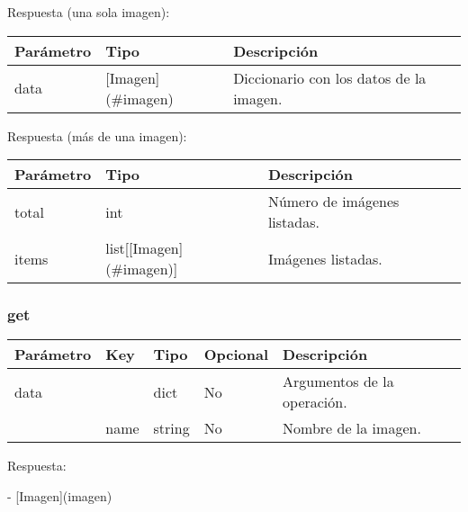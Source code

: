 				Respuesta (una sola imagen):
				\begin{table}[!h]
					\centering
	\begin{adjustbox}{max width=\textwidth}
					\begin{tabular}{|l|l|l|}
						\hline
						Parámetro & Tipo & Descripción \\ \hline
						data & [Imagen](\#imagen) & Diccionario con los datos de la imagen. \\ \hline
					\end{tabular}
\end{adjustbox}
				\end{table}
			
				Respuesta (más de una imagen):
				\begin{table}[!h]
					\centering
	\begin{adjustbox}{max width=\textwidth}
					\begin{tabular}{|l|l|l|}
						\hline
						Parámetro & Tipo & Descripción \\ \hline
						total & int & Número de imágenes listadas. \\ \hline
						items & list[[Imagen](\#imagen)] & Imágenes listadas. \\ \hline
					\end{tabular}
\end{adjustbox}
				\end{table}
			
			\subsubsection{get}
				\begin{table}[!h]
					\centering
	\begin{adjustbox}{max width=\textwidth}
					\begin{tabular}{|l|l|l|l|l|}
						\hline
						Parámetro & Key & Tipo & Opcional & Descripción \\ \hline
						data &  & dict & No & Argumentos de la operación. \\ \hline
						& name & string & No & Nombre de la imagen. \\ \hline
					\end{tabular}
\end{adjustbox}
				\end{table}
			
				Respuesta:
				
				- [Imagen](imagen)
				
